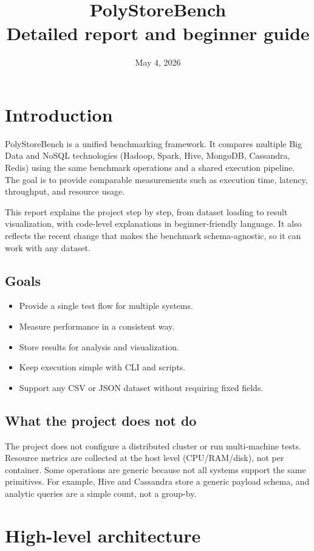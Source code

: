 \documentclass[12pt]{report}
\title{PolyStoreBench \\ Detailed report and beginner guide}
\author{}
\date{May 4, 2026}
\begin{document}
\maketitle
\tableofcontents
\listoffigures
\lstlistoflistings

\chapter{Introduction}
PolyStoreBench is a unified benchmarking framework. It compares multiple Big Data and NoSQL
technologies (Hadoop, Spark, Hive, MongoDB, Cassandra, Redis) using the same benchmark operations
and a shared execution pipeline. The goal is to provide comparable measurements such as execution
time, latency, throughput, and resource usage.

This report explains the project step by step, from dataset loading to result visualization,
with code-level explanations in beginner-friendly language. It also reflects the recent change
that makes the benchmark schema-agnostic, so it can work with any dataset.

\section{Goals}
\begin{itemize}
  \item Provide a single test flow for multiple systems.
  \item Measure performance in a consistent way.
  \item Store results for analysis and visualization.
  \item Keep execution simple with CLI and scripts.
  \item Support any CSV or JSON dataset without requiring fixed fields.
\end{itemize}

\section{What the project does not do}
The project does not configure a distributed cluster or run multi-machine tests. Resource
metrics are collected at the host level (CPU/RAM/disk), not per container. Some operations are
generic because not all systems support the same primitives. For example, Hive and Cassandra
store a generic payload schema, and analytic queries are a simple count, not a group-by.

\chapter{High-level architecture}
\end{document}
